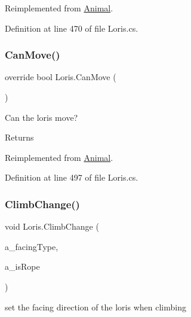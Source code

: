 Reimplemented from \mbox{\hyperlink{class_animal_ad1033798d72c010a822937be75c5bdde}{Animal}}.



Definition at line 470 of file Loris.\+cs.

\mbox{\label{class_loris_a58dcb13392476fa95e7f9f26c5f46ce6}} 
\subsubsection{\texorpdfstring{Can\+Move()}{CanMove()}}
{\footnotesize\ttfamily override bool Loris.\+Can\+Move (\begin{DoxyParamCaption}{ }\end{DoxyParamCaption})\hspace{0.3cm}{\ttfamily [virtual]}}



Can the loris move? 

\begin{DoxyReturn}{Returns}

\end{DoxyReturn}


Reimplemented from \mbox{\hyperlink{class_animal_a50a5002837a408f0032cc6d84ba60d1e}{Animal}}.



Definition at line 497 of file Loris.\+cs.

\mbox{\label{class_loris_aa7b28f6b9624e4a55e63c77a077dc6ad}} 
\subsubsection{\texorpdfstring{Climb\+Change()}{ClimbChange()}}
{\footnotesize\ttfamily void Loris.\+Climb\+Change (\begin{DoxyParamCaption}\item[{\mbox{\hyperlink{_animal_8cs_a57d10208ebba781ae206546ada2002b6}{F\+A\+C\+I\+N\+G\+\_\+\+D\+IR}}}]{a\+\_\+facing\+Type,  }\item[{bool}]{a\+\_\+is\+Rope }\end{DoxyParamCaption})}



set the facing direction of the loris when climbing 


